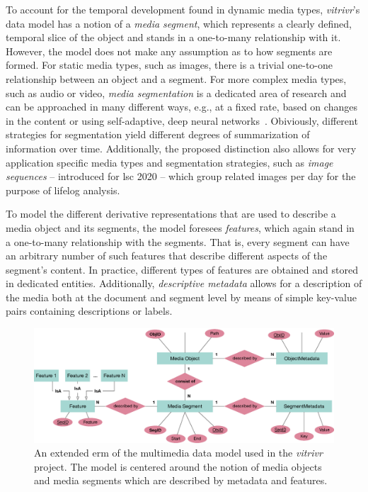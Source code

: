 To account for the temporal development found in dynamic media types, \emph{vitrivr}'s data model has a notion of a \emph{media segment}, which represents a clearly defined, temporal slice of the object and stands in a one-to-many relationship with it. However, the model does not make any assumption as to how segments are formed. For static media types, such as images, there is a trivial one-to-one relationship between an object and a segment. For more complex media types, such as audio or video, \emph{media segmentation} is a dedicated area of research \cite{Koprinska:2001temporal} and can be approached in many different ways, e.g., at a fixed rate, based on changes in the content \cite{Foote:2000Automatic,Tsai:2016video} or using self-adaptive, deep neural networks~\cite{Souvcek:2019transnet}. Obiviously, different strategies for segmentation yield different degrees of summarization of information over time. Additionally, the proposed distinction also allows for very application specific media types and segmentation strategies, such as \emph{image sequences} -- introduced for \acrshort{lsc} 2020 \cite{Heller:2020Interactive} -- which group related images per day for the purpose of lifelog analysis.

To model the different derivative representations that are used to describe a media object and its segments, the model foresees \emph{features}, which again stand in a one-to-many relationship with the segments. That is, every segment can have an arbitrary number of such features that describe different aspects of the segment's content. In practice, different types of features are obtained and stored in dedicated entities. Additionally, \emph{descriptive metadata} allows for a description of the media both at the document and segment level by means of simple key-value pairs containing descriptions or labels.

\begin{figure}[bt]
    \centering
    \includegraphics[width=\textwidth]{figures/erm-media-data-vitrivr}
    \caption{An extended \acrshort{erm} of the multimedia data model used in the \emph{vitrivr} project. The model is centered around the notion of media objects and media segments which are described by metadata and features.}
    \label{figure:erm_mediadata_vitrivr}
\end{figure}

